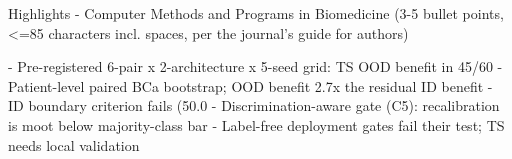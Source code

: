 Highlights - Computer Methods and Programs in Biomedicine
(3-5 bullet points, <=85 characters incl. spaces, per the journal's guide for authors)

- Pre-registered 6-pair x 2-architecture x 5-seed grid: TS OOD benefit in 45/60
- Patient-level paired BCa bootstrap; OOD benefit 2.7x the residual ID benefit
- ID boundary criterion fails (50.0%
- Discrimination-aware gate (C5): recalibration is moot below majority-class bar
- Label-free deployment gates fail their test; TS needs local validation
